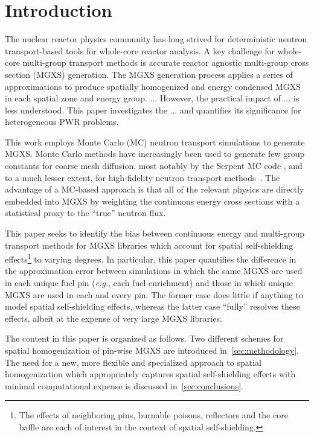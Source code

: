 \section{Introduction}
\label{sec:intro}

The nuclear reactor physics community has long strived for deterministic neutron transport-based tools for whole-core reactor analysis. A key challenge for whole-core multi-group transport methods is accurate reactor agnostic multi-group cross section (MGXS) generation. The MGXS generation process applies a series of approximations to produce spatially homogenized and energy condensed MGXS in each spatial zone and energy group. ... However, the practical impact of ... is less understood. This paper investigates the ... and quantifies its significance for heterogeneous PWR problems.

This work employs Monte Carlo (MC) neutron transport simulations to generate MGXS. Monte Carlo methods have increasingly been used to generate few group constants for coarse mesh diffusion, most notably by the Serpent MC code \citep{serpent2013manual}, and to a much lesser extent, for high-fidelity neutron transport methods~\citep{redmond1997multigroup, nelson2014improved, cai2014condensation, boyd2016thesis}. The advantage of a MC-based approach is that all of the relevant physics are directly embedded into MGXS by weighting the continuous energy cross sections with a statistical proxy to the ``true'' neutron flux. 

This paper seeks to identify the bias between continuous energy and multi-group transport methods for MGXS libraries which account for spatial self-shielding effects\footnote{The effects of neighboring pins, burnable poisons, reflectors and the core baffle are each of interest in the context of spatial self-shielding.} to varying degrees. In particular, this paper quantifies the difference in the approximation error between simulations in which the same MGXS are used in each unique fuel pin (\textit{e.g.}, each fuel enrichment) and those in which unique MGXS are used in each and every pin. The former case does little if anything to model spatial self-shielding effects, whereas the latter case ``fully'' resolves these effects, albeit at the expense of very large MGXS libraries.


The content in this paper is organized as follows. Two different schemes for spatial homogenization of pin-wise MGXS are introduced in~\autoref{sec:methodology}. The need for a new, more flexible and specialized approach to spatial homogenization which appropriately captures spatial self-shielding effects with minimal computational expense is discussed in~\autoref{sec:conclusions}.